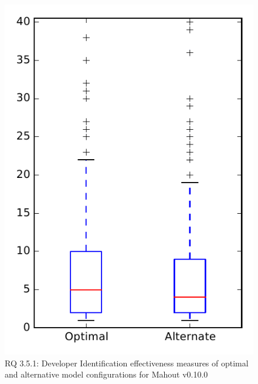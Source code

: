 
\begin{figure}
\centering
\includegraphics[height=0.4\textheight]{figures/combo/dit_rq1_mahout}
\caption{RQ 3.5.1: Developer Identification effectiveness measures of optimal and alternative model configurations for Mahout v0.10.0}
\label{fig:combo:dit:rq1:mahout}
\end{figure}

